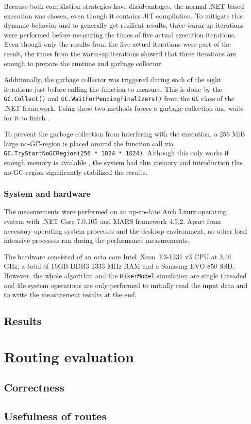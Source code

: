 			Because both compilation strategies have disadvantages, the normal .NET based execution was chosen, even though it contains JIT compilation.			
			To mitigate this dynamic behavior and to generally get resilient results, three warm-up iterations were performed before measuring the times of five actual execution iterations.
			Even though only the results from the five actual iterations were part of the result, the times from the warm-up iterations showed that three iterations are enough to prepare the runtime and garbage collector.
			
			Additionally, the garbage collector was triggered during each of the eight iterations just before calling the function to measure.
			This is done by the \texttt{GC.Collect()} and \texttt{GC.WaitForPendingFinalizers()} from the \texttt{GC} class of the .NET framework.
			Using these two methods forces a garbage collection and waits for it to finish \cite{ms-gc}.
			
			To prevent the garbage collection from interfering with the execution, a 256 MiB large no-GC-region is placed around the function call via \texttt{GC.TryStartNoGCRegion(256 * 1024 * 1024)}.
			Although this only works if enough memory is available \cite{ms-no-gc-region}, the system had this memory and introduction this no-GC-region significantly stabilized the results.
		
		\subsubsection{System and hardware}
		
			The measurements were performed on an up-to-date Arch Linux operating system with .NET Core 7.0.105 and MARS framework 4.5.2.
			Apart from necessary operating system processes and the desktop environment, no other load intensive processes ran during the performance measurements.
			
			The hardware consisted of an octa core Intel\textregistered\ Xeon\textregistered\ E3-1231 v3 CPU at 3.40 GHz, a total of 16GB DDR3 1333 MHz RAM and a Samsung EVO 850 SSD.
			However, the whole algorithm and the \texttt{HikerModel} simulation are single threaded and file system operations are only performed to initially read the input data and to write the measurement results at the end.
	
	\subsection{Results}
	
\section{Routing evaluation}

	\subsection{Correctness}
	

	\subsection{Usefulness of routes}
	
